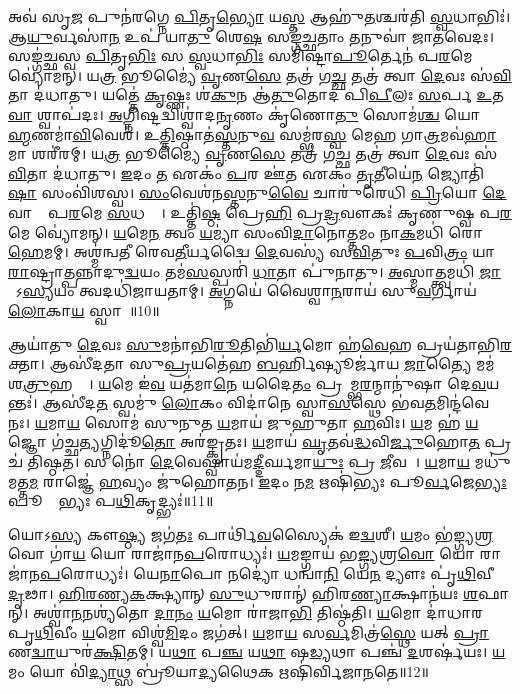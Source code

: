 𑌅𑌵॑ 𑌸𑍃\ul{𑌜} 𑌪𑍁𑌨॑𑌰𑌗𑍍𑌨𑍇 \ul{𑌪𑌿}𑌤𑍃\ul{𑌭𑍍𑌯𑍋} 𑌯\ul{𑌸𑍍𑌤} 𑌆𑌹𑍁॑\ul{𑌤}𑌶𑍍𑌚𑌰॑𑌤𑌿 \ul{𑌸𑍍𑌵}𑌧𑌾𑌭𑌿𑌃॑। 
𑌆\ul{𑌯𑍁}𑌰𑍍𑌵𑌸𑌾॑\ul{𑌨} 𑌉𑌪॑ 𑌯𑌾\ul{𑌤𑍁} 𑌶𑍇\ul{𑌷}\ul{} 𑌸𑌙𑍍𑌗॑𑌚𑍍𑌛𑌤𑌾𑌂 \ul{𑌤}𑌨𑍁𑌵𑌾॑ 𑌜𑌾𑌤𑌵𑍇𑌦𑌃। 
𑌸𑌙𑍍𑌗॑𑌚𑍍𑌛𑌸𑍍𑌵 \ul{𑌪𑌿}𑌤𑍃\ul{𑌭𑌿𑌃} 𑌸 \ul{𑌸𑍍𑌵}𑌧𑌾\ul{𑌭𑌿𑌃} 𑌸𑌮𑌿॑𑌷𑍍𑌟𑌾\ul{𑌪𑍂}𑌰𑍍𑌤𑍇𑌨॑ 𑌪\ul{𑌰}𑌮𑍇 𑌵𑍍𑌯𑍋॑𑌮𑌨𑍍। 
𑌯\ul{𑌤𑍍𑌰} 𑌭𑍂𑌮𑍍𑌯𑍈॑ \ul{𑌵𑍃}𑌣\ul{𑌸𑍇} 𑌤𑌤𑍍𑌰॑ 𑌗\ul{𑌚𑍍𑌛} 𑌤𑌤𑍍𑌰॑ 𑌤𑍍𑌵𑌾 \ul{𑌦𑍇}𑌵𑌃 𑌸॑\ul{𑌵𑌿}𑌤𑌾 𑌦॑𑌧𑌾𑌤𑍁। 
𑌯𑌤𑍍𑌤𑍇॑ \ul{𑌕𑍃}𑌷𑍍𑌣𑌃  𑌶॑\ul{𑌕𑍁}𑌨 𑌆॑\ul{𑌤𑍁}𑌤𑍋𑌦॑ 𑌪𑌿\ul{𑌪𑍀}𑌲𑌃 \ul{𑌸}𑌰𑍍𑌪 \ul{𑌉}𑌤 \ul{𑌵𑌾} 𑌶𑍍𑌵𑌾𑌪॑𑌦𑌃। 
\ul{𑌅}𑌗𑍍𑌨𑌿𑌷𑍍𑌟𑌦𑍍𑌵𑌿𑌶𑍍𑌵𑌾॑𑌦\ul{𑌨𑍃}𑌣𑌂 𑌕𑍃॑𑌣𑍋\ul{𑌤𑍁} 𑌸𑍋𑌮॑\ul{𑌶𑍍𑌚} 𑌯𑍋 𑌬𑍍𑌰𑌾᳚\ul{𑌹𑍍𑌮}𑌣𑌮𑌾॑\ul{𑌵𑌿}𑌵𑍇𑌶॑। 
𑌉\ul{𑌤𑍍𑌤𑌿}𑌷𑍍𑌠𑌾𑌤॑\ul{𑌸𑍍𑌤}𑌨𑍁\ul{𑌵}\ul{} 𑌸𑌮𑍍𑌭॑𑌰\ul{𑌸𑍍𑌵} 𑌮𑍇𑌹 𑌗𑌾\ul{𑌤𑍍𑌰}𑌮𑌵॑\ul{𑌹𑌾} 𑌮𑌾 𑌶𑌰𑍀॑𑌰𑌮𑍍। 
𑌯\ul{𑌤𑍍𑌰} 𑌭𑍂𑌮𑍍𑌯𑍈॑ \ul{𑌵𑍃}𑌣\ul{𑌸𑍇} 𑌤𑌤𑍍𑌰॑ 𑌗\ul{𑌚𑍍𑌛} 𑌤𑌤𑍍𑌰॑ 𑌤𑍍𑌵𑌾 \ul{𑌦𑍇}𑌵𑌃 𑌸॑\ul{𑌵𑌿}𑌤𑌾 𑌦॑𑌧𑌾𑌤𑍁। 
\ul{𑌇}𑌦𑌂 \ul{𑌤} 𑌏𑌕𑌂॑ \ul{𑌪}𑌰 𑌊॑\ul{𑌤} 𑌏𑌕𑌂॑ \ul{𑌤𑍃}𑌤𑍀𑌯𑍇॑\ul{𑌨} 𑌜𑍍𑌯𑍋𑌤𑌿॑\ul{𑌷𑌾} 𑌸𑌂𑌵𑌿॑𑌶𑌸𑍍𑌵। 
\ul{𑌸𑌂}𑌵𑍇𑌶॑𑌨\ul{𑌸𑍍𑌤}𑌨𑍁\ul{𑌵𑍈} 𑌚𑌾𑌰𑍁॑𑌰𑍇𑌧𑌿 \ul{𑌪𑍍𑌰𑌿}𑌯𑍋 \ul{𑌦𑍇}𑌵𑌾𑌨𑌾𑌂᳚ 𑌪\ul{𑌰}𑌮𑍇 \ul{𑌸}𑌧𑌸𑍍𑌥𑍇᳚। 
𑌉𑌤𑍍𑌤𑌿॑\ul{𑌷𑍍𑌠} 𑌪𑍍𑌰𑍇\ul{𑌹𑌿} 𑌪𑍍𑌰\ul{𑌦𑍍𑌰}𑌵𑍗𑌕𑌃॑ 𑌕𑍃𑌣𑍁𑌷𑍍𑌵 𑌪\ul{𑌰}𑌮𑍇 𑌵𑍍𑌯𑍋॑𑌮𑌨𑍍। 
\ul{𑌯}𑌮𑍇\ul{𑌨} 𑌤𑍍𑌵𑌂 \ul{𑌯}𑌮𑍍𑌯𑌾॑ 𑌸𑌂𑌵𑌿\ul{𑌦𑌾}𑌨𑍋\ul{𑌤𑍍𑌤}𑌮𑌂 𑌨𑌾\ul{𑌕}𑌮𑌧𑌿॑ 𑌰𑍋\ul{𑌹𑍇}𑌮𑌮𑍍। 
𑌅𑌶𑍍𑌮॑𑌨𑍍𑌵𑌤𑍀 𑌰𑍇𑌵\ul{𑌤𑍀}𑌰𑍍𑌯𑌦𑍍𑌵𑍈 \ul{𑌦𑍇}𑌵𑌸𑍍𑌯॑ 𑌸\ul{𑌵𑌿}𑌤𑍁𑌃 \ul{𑌪}𑌵𑌿\ul{𑌤𑍍𑌰𑌂} 𑌯𑌾 \ul{𑌰𑌾}𑌷𑍍𑌟𑍍𑌰𑌾\ul{𑌤𑍍𑌪}𑌨𑍍𑌨𑌾𑌦𑍁\ul{𑌦𑍍𑌵}𑌯𑌂 𑌤𑌮॑\ul{𑌸}𑌸𑍍𑌪𑌰𑌿॑ \ul{𑌧𑌾}𑌤𑌾 𑌪𑍁॑𑌨𑌾𑌤𑍁। 
\ul{𑌅}𑌸𑍍𑌮𑌾𑌤𑍍𑌤𑍍𑌵𑌮𑌧𑌿॑ \ul{𑌜𑌾}𑌤𑍋᳚𑌽\ul{𑌸𑍍𑌯}𑌯𑌂 𑌤𑍍𑌵𑌦𑌧𑌿॑𑌜𑌾𑌯𑌤𑌾𑌮𑍍। 
\ul{𑌅}𑌗𑍍𑌨𑌯𑍇॑ 𑌵𑍈𑌶𑍍𑌵𑌾\ul{𑌨}𑌰𑌾𑌯॑ 𑌸𑍁\ul{𑌵}𑌰𑍍𑌗𑌾𑌯॑ \ul{𑌲𑍋}𑌕𑌾\ul{𑌯} 𑌸𑍍𑌵𑌾𑌹𑌾᳚॥10॥
\anuvakamend[𑌅𑌵॑𑌶𑍀𑌯𑌤𑌾\dng{ꣳ} \ul{𑌸}𑌧\ul{𑌸𑍍𑌥𑍇} 𑌪𑌞𑍍𑌚॑ 𑌚]

𑌆𑌯𑌾॑𑌤𑍁 \ul{𑌦𑍇}𑌵𑌃 \ul{𑌸𑍁}𑌮𑌨𑌾॑𑌭𑌿\ul{𑌰𑍂}𑌤𑌿𑌭𑌿॑\ul{𑌰𑍍𑌯}𑌮𑍋 𑌹॑\ul{𑌵𑍇}𑌹 𑌪𑍍𑌰𑌯॑𑌤𑌾𑌭𑌿\ul{𑌰}𑌕𑍍𑌤𑌾। 
𑌆𑌸𑍀॑𑌦𑌤𑌾 𑌸𑍁\ul{𑌪𑍍𑌰}𑌯𑌤𑍇॑𑌹 \ul{𑌬}𑌰𑍍\mbox{}𑌹𑌿𑌷𑍍𑌯𑍂𑌰𑍍𑌜𑌾॑𑌯 \ul{𑌜𑌾}𑌤𑍍𑌯𑍈 𑌮𑌮॑ 𑌶\ul{𑌤𑍍𑌰𑍁}𑌹𑌤𑍍𑌯𑍈᳚। 
\ul{𑌯}𑌮𑍇 𑌇॑\ul{𑌵} 𑌯𑌤॑𑌮𑌾\ul{𑌨𑍇} 𑌯𑌦𑍈\ul{𑌤𑌂} 𑌪𑍍𑌰𑌵𑌾᳚𑌮𑍍𑌭\ul{𑌰}𑌨𑍍𑌮𑌾𑌨𑍁॑𑌷𑌾 𑌦𑍇\ul{𑌵}𑌯𑌨𑍍𑌤𑌃॑। 
𑌆𑌸𑍀॑𑌦\ul{𑌤}\ul{} 𑌸𑍍𑌵𑌮𑍁॑ \ul{𑌲𑍋}𑌕𑌂  𑌵𑌿𑌦𑌾॑𑌨𑍇 𑌸𑍍𑌵𑌾\ul{𑌸}𑌸𑍍𑌥𑍇 𑌭॑𑌵\ul{𑌤}𑌮𑌿𑌨𑍍𑌦॑𑌵𑍇 𑌨𑌃। 
\ul{𑌯}𑌮𑌾\ul{𑌯} 𑌸𑍋𑌮॑ 𑌸𑍁𑌨𑍁𑌤 \ul{𑌯}𑌮𑌾𑌯॑ 𑌜𑍁𑌹𑍁𑌤𑌾 \ul{𑌹}𑌵𑌿𑌃। 
\ul{𑌯}𑌮 𑌹॑ \ul{𑌯}𑌜𑍍𑌞𑍋 𑌗॑𑌚𑍍𑌛\ul{𑌤𑍍𑌯}𑌗𑍍𑌨𑌿𑌦𑍂॑\ul{𑌤𑍋} 𑌅𑌰॑𑌙𑍍𑌕𑍃𑌤𑌃। 
\ul{𑌯}𑌮𑌾𑌯॑ \ul{𑌘𑍃}𑌤𑌵॑\ul{𑌦𑍍𑌧}𑌵𑌿\ul{𑌰𑍍𑌜𑍁}𑌹𑍋\ul{𑌤} 𑌪𑍍𑌰 𑌚॑ 𑌤𑌿𑌷𑍍𑌠𑌤। 
𑌸 𑌨𑍋॑ \ul{𑌦𑍇}𑌵𑍇𑌷𑍍𑌵𑌾𑌯॑𑌮\ul{𑌦𑍍𑌦𑍀}𑌰𑍍𑌘𑌮𑌾\ul{𑌯𑍁𑌃} 𑌪𑍍𑌰 \ul{𑌜𑍀}𑌵𑌸𑍇᳚। 
\ul{𑌯}𑌮𑌾\ul{𑌯} 𑌮𑌧𑍁॑𑌮𑌤𑍍𑌤\ul{𑌮}\ul{} 𑌰𑌾𑌜𑍍𑌞𑍇॑ \ul{𑌹}𑌵𑍍𑌯𑌂 𑌜𑍁॑𑌹𑍋𑌤𑌨। 
\ul{𑌇}𑌦𑌂 𑌨\ul{𑌮} 𑌋𑌷𑌿॑𑌭𑍍𑌯𑌃 𑌪𑍂\ul{𑌰𑍍𑌵}𑌜𑍇\ul{𑌭𑍍𑌯𑌃} 𑌪𑍂𑌰𑍍𑌵𑍇᳚𑌭𑍍𑌯𑌃 𑌪\ul{𑌥𑌿}𑌕𑍃𑌦𑍍𑌭𑍍𑌯𑌃॑॥11॥

𑌯𑍋𑌽\ul{𑌸𑍍𑌯} 𑌕𑍗\ul{𑌷𑍍𑌠𑍍𑌯} 𑌜𑌗॑\ul{𑌤𑌃} 𑌪𑌾𑌰𑍍𑌥𑌿॑\ul{𑌵}𑌸𑍍𑌯𑍈𑌕॑ 𑌇\ul{𑌦𑍍𑌵}𑌶𑍀। 
\ul{𑌯}𑌮𑌂 𑌭॑𑌙𑍍𑌗𑍍𑌯\ul{𑌶𑍍𑌰}𑌵𑍋 𑌗𑌾॑\ul{𑌯} 𑌯𑍋 𑌰𑌾𑌜𑌾॑𑌨\ul{𑌪}𑌰𑍋𑌧𑍍𑌯𑌃॑। 
\ul{𑌯}𑌮𑌙𑍍𑌗𑌾𑌯॑ 𑌭\ul{𑌙𑍍𑌗𑍍𑌯}𑌶𑍍𑌰\ul{𑌵𑍋} 𑌯𑍋 𑌰𑌾𑌜𑌾॑𑌨\ul{𑌪}𑌰𑍋𑌧𑍍𑌯𑌃॑। 
𑌯𑍇\ul{𑌨𑌾}𑌪𑍋 \ul{𑌨}𑌦𑍍𑌯𑍋॑ 𑌧𑌨𑍍𑌵𑌾॑\ul{𑌨𑌿} 𑌯𑍇\ul{𑌨} 𑌦𑍍𑌯𑍗𑌃 𑌪𑍃॑\ul{𑌥𑌿}𑌵𑍀 \ul{𑌦𑍃}𑌢𑌾। 
\ul{𑌹𑌿}\ul{𑌰}\ul{𑌣𑍍𑌯}\ul{𑌕}𑌕𑍍𑌷𑍍𑌯𑌾𑌨𑍍 \ul{𑌸𑍁}𑌧𑍁𑌰𑌾𑌨𑍍॑ 𑌹𑌿𑌰\ul{𑌣𑍍𑌯𑌾}𑌕𑍍𑌷𑌾𑌨॑𑌯𑌃  \ul{𑌶}𑌫𑌾𑌨𑍍। 
𑌅𑌶𑍍𑌵𑌾॑\ul{𑌨}𑌨𑌶𑍍𑌯॑𑌤𑍋 \ul{𑌦𑌾}\ul{𑌨𑌂} \ul{𑌯}𑌮𑍋 𑌰𑌾॑𑌜𑌾\ul{𑌭𑌿} 𑌤𑌿𑌷𑍍𑌠॑𑌤𑌿। 
\ul{𑌯}𑌮𑍋 𑌦𑌾॑𑌧𑌾𑌰 𑌪𑍃\ul{𑌥𑌿}𑌵𑍀𑌂 \ul{𑌯}𑌮𑍋 𑌵𑌿𑌶𑍍𑌵॑\ul{𑌮𑌿}𑌦𑌂 𑌜𑌗॑𑌤𑍍। 
\ul{𑌯}𑌮𑌾\ul{𑌯} 𑌸\ul{𑌰𑍍𑌵}𑌮𑌿𑌤𑍍𑌰॑\ul{𑌸𑍍𑌥𑍇} 𑌯𑌤𑍍 \ul{𑌪𑍍𑌰𑌾}𑌣\ul{𑌦𑍍𑌵𑌾}𑌯𑍁𑌰॑\ul{𑌕𑍍𑌷𑌿}𑌤𑌮𑍍। 
𑌯\ul{𑌥𑌾} 𑌪\ul{𑌞𑍍𑌚} 𑌯\ul{𑌥𑌾} 𑌷\ul{𑌡𑍍𑌯}𑌥𑌾 𑌪𑌞𑍍𑌚॑ \ul{𑌦}𑌶𑌰𑍍\mbox{}𑌷॑𑌯𑌃। 
\ul{𑌯}𑌮𑌂 𑌯𑍋 𑌵𑌿॑\ul{𑌦𑍍𑌯𑌾}𑌥𑍍𑌸 𑌬𑍍𑌰𑍂॑𑌯𑌾\ul{𑌦𑍍𑌯}𑌥𑍈𑌕 𑌋𑌷𑌿॑𑌰𑍍𑌵𑌿𑌜𑌾\ul{𑌨}𑌤𑍇॥12॥

